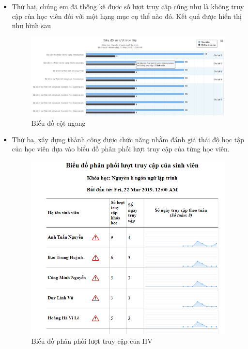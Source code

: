 \begin{itemize}
	\vskip 5cm
	\item Thứ hai, chúng em đã thống kê được số lượt truy cập cũng như là không truy cập của học viên đối với một hạng mục cụ thể nào đó. Kết quả được hiển thị như hình sau
	
	\begin{center}
		\begin{figure}[htp]
			\begin{center}
				\includegraphics[width=1\linewidth]{img/27}
			\end{center}
			\caption{Biểu đồ cột ngang}
			\label{refhinh72}
		\end{figure}
	\end{center}

	\item Thứ ba, xây dựng thành công được chức năng nhằm đánh giá thái độ học tập của học viên dựa vào biểu đồ phân phối lượt truy cập của từng học viên.
	
	\begin{center}
		\begin{figure}[htp]
			\begin{center}
				\includegraphics[width=0.6\linewidth]{img/29}
			\end{center}
			\caption{Biểu đồ phân phối lượt truy cập của HV}
			\label{refhinh73}
		\end{figure}
	\end{center}


\end{itemize}
